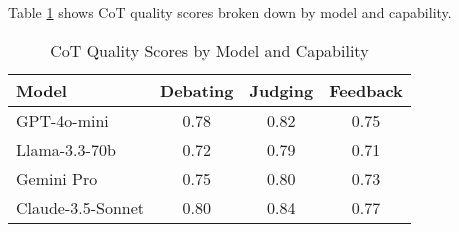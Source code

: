 \documentclass[11pt]{article}
\begin{document}
Table \ref{tab:cot_by_model} shows CoT quality scores broken down by model and capability.

\begin{table}[h]
\centering
\caption{CoT Quality Scores by Model and Capability}
\label{tab:cot_by_model}
\begin{tabular}{lccc}
\toprule
Model & Debating & Judging & Feedback \\
\midrule
GPT-4o-mini & 0.78 & 0.82 & 0.75 \\
Llama-3.3-70b & 0.72 & 0.79 & 0.71 \\
Gemini Pro & 0.75 & 0.80 & 0.73 \\
Claude-3.5-Sonnet & 0.80 & 0.84 & 0.77 \\
\bottomrule
\end{tabular}
\end{table}
\end{document}
